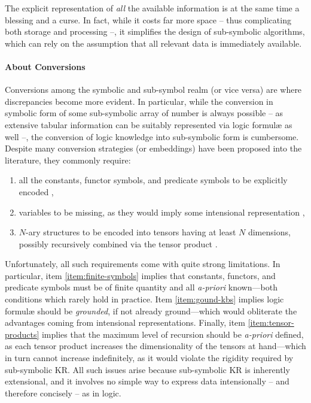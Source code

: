 \documentclass[12pt,a4paper,openright,twoside]{book}
\begin{document}
The explicit representation of \emph{all} the available information is at the same time a blessing and a curse.
%
In fact, while it costs far more space -- thus complicating both storage and processing --, it simplifies the design of sub-symbolic algorithms, which can rely on the assumption that all relevant data is immediately available.

\paragraph{About Conversions}

Conversions among the symbolic and sub-symbol realm (or vice versa) are where discrepancies become more evident.
%
In particular, while the conversion in symbolic form of some sub-symbolic array of number is always possible -- as extensive tabular information can be suitably represented via logic formul\ae{} as well --, the conversion of logic knowledge into sub-symbolic form is cumbersome.
%
Despite many conversion strategies (or embeddings) have been proposed into the literature, they commonly require:
%
\begin{enumerate}
    \item\label{item:finite-symbols} all the constants, functor symbols, and predicate symbols to be explicitly encoded \cite[sec. 6.2]{CropperDM20},
    \item\label{item:gound-kbs} variables to be missing, as they would imply some intensional representation \cite{SerafiniG16},
    \item\label{item:tensor-products} $N$-ary structures to be encoded into tensors having at least $N$ dimensions, possibly recursively combined via the tensor product \cite{Smolensky1990}.
\end{enumerate}
%
Unfortunately, all such requirements come with quite strong limitations.
%
In particular, item \ref{item:finite-symbols} implies that constants, functors, and predicate symbols must be of finite quantity and all \emph{a-priori} known---both conditions which rarely hold in practice.
%
Item \ref{item:gound-kbs} implies logic formul\ae{} should be \emph{grounded}, if not already ground---which would obliterate the advantages coming from intensional representations.
%
Finally, item \ref{item:tensor-products} implies that the maximum level of recursion should be \emph{a-priori} defined, as each tensor product increases the dimensionality of the tensors at hand---which in turn cannot increase indefinitely, as it would violate the rigidity required by sub-symbolic KR.
%
All such issues arise because sub-symbolic KR is inherently extensional, and it involves no simple way to express data intensionally -- and therefore concisely -- as in logic.
\end{document}
